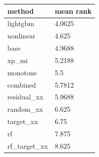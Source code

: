 \begin{tabular}{ll}
\toprule
method & mean rank \\
\midrule
lightgbm & 4.0625 \\
nonlinear & 4.625 \\
base & 4.9688 \\
xp\_mi & 5.2188 \\
monotone & 5.5 \\
combined & 5.7812 \\
residual\_xx & 5.9688 \\
random\_xx & 6.625 \\
target\_xx & 6.75 \\
rf & 7.875 \\
rf\_target\_xx & 8.625 \\
\bottomrule
\end{tabular}
